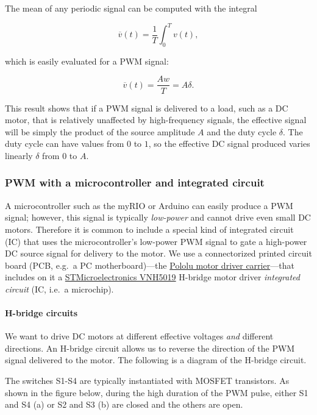 \documentclass[dynamic_systems.tex]{subfiles}
\begin{document}
The mean of any periodic signal can be computed with the integral

\[\overline{v}(t) = \frac{1}{T} \int_0^T v(t),\]

which is easily evaluated for a PWM signal:

\[\overline{v}(t) = \frac{A w}{T} = A \delta.\]

This result shows that if a PWM signal is delivered to a load, such as a
DC motor, that is relatively unaffected by high-frequency signals, the
effective signal will be simply the product of the source amplitude
\(A\) and the duty cycle \(\delta\). The duty cycle can have values from
\(0\) to \(1\), so the effective DC signal produced varies linearly
\(\delta\) from \(0\) to \(A\).
\tags{}

\subsubsection{PWM with a microcontroller and integrated
\tags{}
circuit}\label{pwm-with-a-microcontroller-and-integrated-circuit}

A microcontroller such as the myRIO or Arduino can easily produce a PWM
signal; however, this signal is typically \emph{low-power} and cannot
drive even small DC motors. Therefore it is common to include a special
kind of integrated circuit (IC) that uses the microcontroller's
low-power PWM signal to gate a high-power DC source signal for delivery
to the motor. We use a connectorized printed circuit board (PCB, e.g.~a
PC motherboard)---the
\href{../../resources/pololu_VNH5019_motor_driver_carrier.pdf}{Pololu
motor driver carrier}---that includes on it a
\href{../../resources/vnh5019.pdf}{STMicroelectronics VNH5019} H-bridge
motor driver \emph{integrated circuit} (IC, i.e.~a microchip).
\tags{}
\paragraph{H-bridge circuits}\label{h-bridge-circuits}

We want to drive DC motors at different effective voltages \emph{and}
different directions. An H-bridge circuit allows us to reverse the
direction of the PWM signal delivered to the motor. The following is a
diagram of the H-bridge circuit.
\tags{}

The switches S1-S4 are typically instantiated with MOSFET transistors.
As shown in the figure below, during the high duration of the PWM pulse,
either S1 and S4 (a) or S2 and S3 (b) are closed and the others are
open.
\tags{}
\end{document}
